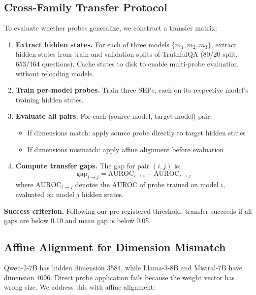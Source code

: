 \subsection{Cross-Family Transfer Protocol}

To evaluate whether probes generalize, we construct a transfer matrix:

\begin{enumerate}
\item \textbf{Extract hidden states.} For each of three models $\{m_1, m_2, m_3\}$, extract hidden states from train and validation splits of TruthfulQA (80/20 split, 653/164 questions). Cache states to disk to enable multi-probe evaluation without reloading models.

\item \textbf{Train per-model probes.} Train three SEPs, each on its respective model's training hidden states.

\item \textbf{Evaluate all pairs.} For each (source model, target model) pair:
\begin{itemize}
\item If dimensions match: apply source probe directly to target hidden states
\item If dimensions mismatch: apply affine alignment before evaluation
\end{itemize}

\item \textbf{Compute transfer gaps.} The gap for pair $(i, j)$ is:
\begin{equation}
\text{gap}_{i \to j} = \text{AUROC}_{i \to i} - \text{AUROC}_{i \to j}
\end{equation}
where $\text{AUROC}_{i \to j}$ denotes the AUROC of probe trained on model $i$, evaluated on model $j$ hidden states.
\end{enumerate}

\textbf{Success criterion.} Following our pre-registered threshold, transfer succeeds if all gaps are below 0.10 and mean gap is below 0.05.

\subsection{Affine Alignment for Dimension Mismatch}

Qwen-2-7B has hidden dimension 3584, while Llama-3-8B and Mistral-7B have dimension 4096. Direct probe application fails because the weight vector has wrong size. We address this with affine alignment:

